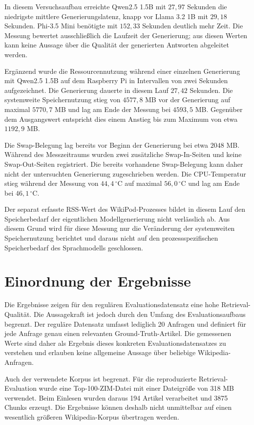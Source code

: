 In diesem Versuchsaufbau erreichte Qwen2.5 1.5B mit $27{,}97$ Sekunden
die niedrigste mittlere Generierungslatenz, knapp vor Llama 3.2 1B mit
$29{,}18$ Sekunden. Phi-3.5 Mini benötigte mit $152{,}33$ Sekunden
deutlich mehr Zeit. Die Messung bewertet ausschließlich die Laufzeit der
Generierung; aus diesen Werten kann keine Aussage über die Qualität der
generierten Antworten abgeleitet werden.

Ergänzend wurde die Ressourcennutzung während einer einzelnen
Generierung mit Qwen2.5 1.5B auf dem Raspberry Pi in Intervallen von zwei
Sekunden aufgezeichnet. Die Generierung dauerte in diesem Lauf
$27{,}42$ Sekunden. Die systemweite Speichernutzung stieg von
$4577{,}8$ MB vor der Generierung auf maximal $5770{,}7$ MB und lag am
Ende der Messung bei $4593{,}5$ MB. Gegenüber dem Ausgangswert entspricht
dies einem Anstieg bis zum Maximum von etwa $1192{,}9$ MB.

Die Swap-Belegung lag bereits vor Beginn der Generierung bei etwa
$2048$ MB. Während des Messzeitraums wurden zwei zusätzliche
Swap-In-Seiten und keine Swap-Out-Seiten registriert. Die bereits
vorhandene Swap-Belegung kann daher nicht der untersuchten Generierung
zugeschrieben werden. Die CPU-Temperatur stieg während der Messung von
$44{,}4\,^\circ$C auf maximal $56{,}0\,^\circ$C und lag am Ende bei
$46{,}1\,^\circ$C.

Der separat erfasste RSS-Wert des WikiPod-Prozesses bildet in diesem Lauf
den Speicherbedarf der eigentlichen Modellgenerierung nicht verlässlich
ab. Aus diesem Grund wird für diese Messung nur die Veränderung der
systemweiten Speichernutzung berichtet und daraus nicht auf den
prozessspezifischen Speicherbedarf des Sprachmodells geschlossen.

\section{Einordnung der Ergebnisse}

Die Ergebnisse zeigen für den regulären Evaluationsdatensatz eine hohe
Retrieval-Qualität. Die Aussagekraft ist jedoch durch den Umfang des
Evaluationsaufbaus begrenzt. Der reguläre Datensatz umfasst lediglich
20 Anfragen und definiert für jede Anfrage genau einen relevanten
Ground-Truth-Artikel. Die gemessenen Werte sind daher als Ergebnis dieses
konkreten Evaluationsdatensatzes zu verstehen und erlauben keine allgemeine
Aussage über beliebige Wikipedia-Anfragen.

Auch der verwendete Korpus ist begrenzt. Für die reproduzierte
Retrieval-Evaluation wurde eine Top-100-ZIM-Datei mit einer Dateigröße von
318 MB verwendet. Beim Einlesen wurden daraus 194 Artikel verarbeitet und
3875 Chunks erzeugt. Die Ergebnisse können deshalb nicht unmittelbar auf
einen wesentlich größeren Wikipedia-Korpus übertragen werden.


